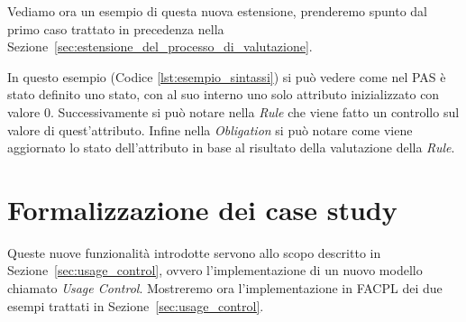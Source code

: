 Vediamo ora un esempio di questa nuova estensione, prenderemo spunto dal primo caso trattato in precedenza nella Sezione~\ref{sec:estensione_del_processo_di_valutazione}.

In questo esempio (Codice \ref{lst:esempio_sintassi}) si può vedere come nel PAS è stato definito uno stato, con al suo interno uno solo attributo inizializzato con valore $0$.
Successivamente si può notare nella \textit{Rule} che viene fatto un controllo sul valore di quest'attributo.
Infine nella \textit{Obligation} si può notare come viene aggiornato lo stato dell'attributo in base al risultato della valutazione della \textit{Rule}.

\section{Formalizzazione dei case study} %
\label{sec:esempi}

Queste nuove funzionalità introdotte servono allo scopo descritto in Sezione~\ref{sec:usage_control}, ovvero l'implementazione di un nuovo modello chiamato \textit{Usage Control}.
Mostreremo ora l'implementazione in FACPL dei due esempi trattati in Sezione~\ref{sec:usage_control}. 
